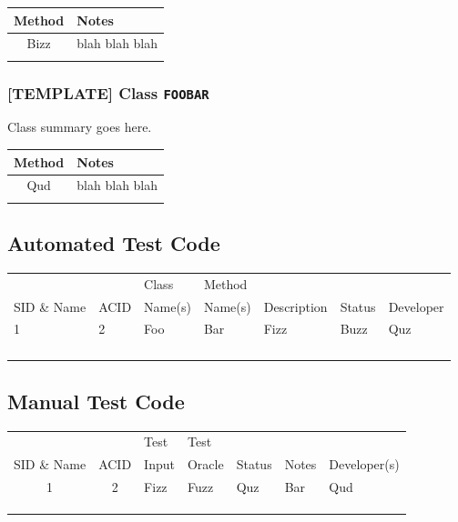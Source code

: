 \documentclass[11pt]{article}
\begin{document}
\begin{center}
\begin{tabular}{|c|l|}
Method & Notes\\
\hline
Bizz & blah blah blah\\
 & \\
\end{tabular}
\end{center}


\subsubsection*{[TEMPLATE] Class \texttt{FOOBAR}}
\label{sec:org5143047}
Class summary goes here.

\begin{center}
\begin{tabular}{|c|l|}
Method & Notes\\
\hline
Qud & blah blah blah\\
 & \\
\end{tabular}
\end{center}


\subsection{Automated Test Code}
\label{sec:org35496c0}

\begin{center}
\begin{tabular}{|l|l|p{2.5cm}|p{2.5cm}|p{2.5cm}|l|l|}
 &  & Class & Method &  &  & \\
SID \& Name & ACID & Name(s) & Name(s) & Description & Status & Developer\\
\hline
1 & 2 & Foo & Bar & Fizz & Buzz & Quz\\
 &  &  &  &  &  & \\
 &  &  &  &  &  & \\
 &  &  &  &  &  & \\
 &  &  &  &  &  & \\
\end{tabular}
\end{center}
\subsection{Manual Test Code}
\label{sec:org95bffe5}
\begin{center}
\begin{tabular}{|c|c|p{2.5cm}|p{2.5cm}|l|l|l|}
 &  & Test & Test &  &  & \\
SID \& Name & ACID & Input & Oracle & Status & Notes & Developer(s)\\
\hline
1 & 2 & Fizz & Fuzz & Quz & Bar & Qud\\
 &  &  &  &  &  & \\
 &  &  &  &  &  & \\
 &  &  &  &  &  & \\
\end{tabular}
\end{center}
\end{document}

